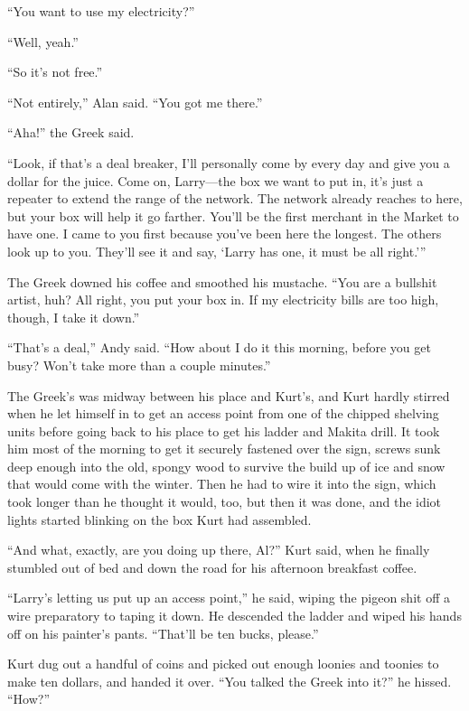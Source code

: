 \documentclass{article}
\begin{document}
``You want to use my electricity?''

``Well, yeah.''

``So it's not free.''

``Not entirely,'' Alan said.  ``You got me there.''

``Aha!'' the Greek said.

``Look, if that's a deal breaker, I'll personally come by every day
and give you a dollar for the juice.  Come on, Larry---the box we want
to put in, it's just a repeater to extend the range of the network. 
The network already reaches to here, but your box will help it go
farther.  You'll be the first merchant in the Market to have one.  I
came to you first because you've been here the longest.  The others
look up to you.  They'll see it and say, `Larry has one, it must be
all right.'''

The Greek downed his coffee and smoothed his mustache.  ``You are a
bullshit artist, huh?  All right, you put your box in.  If my
electricity bills are too high, though, I take it down.''

``That's a deal,'' Andy said.  ``How about I do it this morning,
before you get busy?  Won't take more than a couple minutes.''

The Greek's was midway between his place and Kurt's, and Kurt hardly
stirred when he let himself in to get an access point from one of the
chipped shelving units before going back to his place to get his
ladder and Makita drill.  It took him most of the morning to get it
securely fastened over the sign, screws sunk deep enough into the old,
spongy wood to survive the build up of ice and snow that would come
with the winter.  Then he had to wire it into the sign, which took
longer than he thought it would, too, but then it was done, and the
idiot lights started blinking on the box Kurt had assembled.

``And what, exactly, are you doing up there, Al?'' Kurt said, when he
finally stumbled out of bed and down the road for his afternoon
breakfast coffee.

``Larry's letting us put up an access point,'' he said, wiping the
pigeon shit off a wire preparatory to taping it down.  He descended
the ladder and wiped his hands off on his painter's pants.  ``That'll
be ten bucks, please.''

Kurt dug out a handful of coins and picked out enough loonies and
toonies to make ten dollars, and handed it over.  ``You talked the
Greek into it?'' he hissed.  ``How?''
\end{document}
